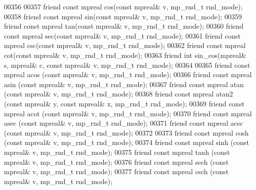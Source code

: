 \begin{DoxyCode}
00356 
00357     \textcolor{keyword}{friend} \textcolor{keyword}{const} mpreal cos(\textcolor{keyword}{const} mpreal& v, mp\_rnd\_t rnd\_mode);
00358     \textcolor{keyword}{friend} \textcolor{keyword}{const} mpreal sin(\textcolor{keyword}{const} mpreal& v, mp\_rnd\_t rnd\_mode);
00359     \textcolor{keyword}{friend} \textcolor{keyword}{const} mpreal tan(\textcolor{keyword}{const} mpreal& v, mp\_rnd\_t rnd\_mode);
00360     \textcolor{keyword}{friend} \textcolor{keyword}{const} mpreal sec(\textcolor{keyword}{const} mpreal& v, mp\_rnd\_t rnd\_mode);
00361     \textcolor{keyword}{friend} \textcolor{keyword}{const} mpreal csc(\textcolor{keyword}{const} mpreal& v, mp\_rnd\_t rnd\_mode);
00362     \textcolor{keyword}{friend} \textcolor{keyword}{const} mpreal cot(\textcolor{keyword}{const} mpreal& v, mp\_rnd\_t rnd\_mode);
00363     \textcolor{keyword}{friend} \textcolor{keywordtype}{int} sin\_cos(mpreal& s, mpreal& c, \textcolor{keyword}{const} mpreal& v, mp\_rnd\_t rnd\_mode);
00364 
00365     \textcolor{keyword}{friend} \textcolor{keyword}{const} mpreal acos  (\textcolor{keyword}{const} mpreal& v, mp\_rnd\_t rnd\_mode);
00366     \textcolor{keyword}{friend} \textcolor{keyword}{const} mpreal asin  (\textcolor{keyword}{const} mpreal& v, mp\_rnd\_t rnd\_mode);
00367     \textcolor{keyword}{friend} \textcolor{keyword}{const} mpreal atan  (\textcolor{keyword}{const} mpreal& v, mp\_rnd\_t rnd\_mode);
00368     \textcolor{keyword}{friend} \textcolor{keyword}{const} mpreal atan2 (\textcolor{keyword}{const} mpreal& y, \textcolor{keyword}{const} mpreal& x, mp\_rnd\_t rnd\_mode);
00369     \textcolor{keyword}{friend} \textcolor{keyword}{const} mpreal acot  (\textcolor{keyword}{const} mpreal& v, mp\_rnd\_t rnd\_mode);
00370     \textcolor{keyword}{friend} \textcolor{keyword}{const} mpreal asec  (\textcolor{keyword}{const} mpreal& v, mp\_rnd\_t rnd\_mode);
00371     \textcolor{keyword}{friend} \textcolor{keyword}{const} mpreal acsc  (\textcolor{keyword}{const} mpreal& v, mp\_rnd\_t rnd\_mode);
00372 
00373     \textcolor{keyword}{friend} \textcolor{keyword}{const} mpreal cosh  (\textcolor{keyword}{const} mpreal& v, mp\_rnd\_t rnd\_mode);
00374     \textcolor{keyword}{friend} \textcolor{keyword}{const} mpreal sinh  (\textcolor{keyword}{const} mpreal& v, mp\_rnd\_t rnd\_mode);
00375     \textcolor{keyword}{friend} \textcolor{keyword}{const} mpreal tanh  (\textcolor{keyword}{const} mpreal& v, mp\_rnd\_t rnd\_mode);
00376     \textcolor{keyword}{friend} \textcolor{keyword}{const} mpreal sech  (\textcolor{keyword}{const} mpreal& v, mp\_rnd\_t rnd\_mode);
00377     \textcolor{keyword}{friend} \textcolor{keyword}{const} mpreal csch  (\textcolor{keyword}{const} mpreal& v, mp\_rnd\_t rnd\_mode);

\end{DoxyCode}

